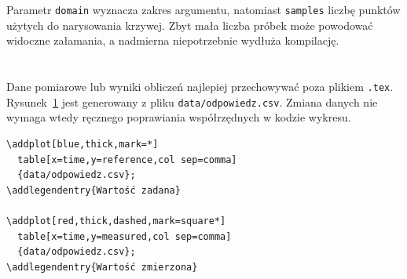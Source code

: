 Parametr \texttt{domain} wyznacza zakres argumentu, natomiast \texttt{samples} liczbę punktów użytych do narysowania krzywej. Zbyt mała liczba próbek może powodować widoczne załamania, a nadmierna niepotrzebnie wydłuża kompilację.

\section{}

Dane pomiarowe lub wyniki obliczeń najlepiej przechowywać poza plikiem \texttt{.tex}. Rysunek~\ref{fig:wykres-csv} jest generowany z pliku \texttt{data/odpowiedz.csv}. Zmiana danych nie wymaga wtedy ręcznego poprawiania współrzędnych w kodzie wykresu.

\begin{figure}[htbp]
  \centering
  \caption{}
  \label{fig:wykres-csv}
\end{figure}

\begin{lstlisting}[caption={\ploren{Wczytywanie dwóch serii z pliku CSV}{Loading two series from a CSV file}}]
\addplot[blue,thick,mark=*]
  table[x=time,y=reference,col sep=comma]
  {data/odpowiedz.csv};
\addlegendentry{Wartość zadana}

\addplot[red,thick,dashed,mark=square*]
  table[x=time,y=measured,col sep=comma]
  {data/odpowiedz.csv};
\addlegendentry{Wartość zmierzona}
\end{lstlisting}

